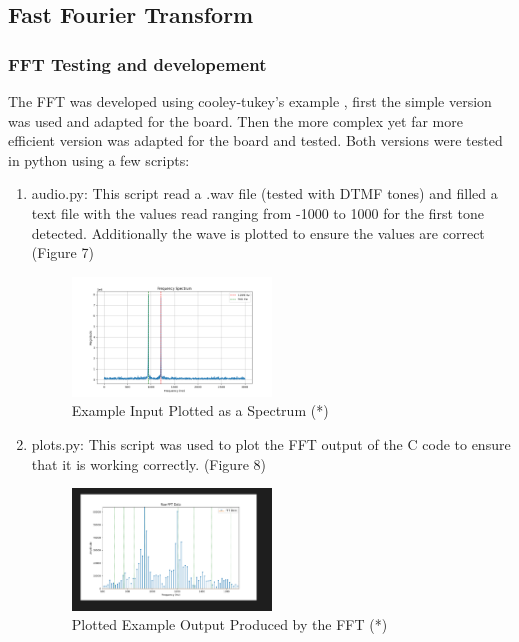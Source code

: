 \documentclass{cce2014-design}
\begin{document}
{  \subsection{Fast Fourier Transform}
  {
	  \subsubsection{FFT Testing and developement}
	  The FFT was developed using cooley-tukey's example
	  \cite{cooleyTukeyFFT}, first the
	  simple version was used and adapted for the board.
	  Then the more complex yet far more efficient version was
	  adapted for the board and tested. Both versions were tested in python
	  using a
	  few scripts:
	  \begin{enumerate}
		  \item audio.py: This script read a .wav file (tested
		        with DTMF tones) and filled a text file with the values
		        read ranging from -1000
		        to 1000 for the first tone detected. Additionally the
		        wave is plotted to ensure the values are correct
		        (Figure 7)
		        \begin{figure}[H]
			        \centering
			        \includegraphics[width=0.5\textwidth]{spectrum}
			        \caption{Example Input Plotted as a
				        Spectrum (*)}
			        \label{fig : Example Input Plotted as a
				        Spectrum}
		        \end{figure}
		  \item plots.py: This script was used to plot the FFT
		        output of the C code to ensure that it is working
		        correctly. (Figure 8)
		        \begin{figure}[H]
			        \centering
			        \includegraphics[width=0.5\textwidth]{fft}
			        \caption{ Plotted Example Output
				        Produced by the FFT (*)}
			        \label{fig : Plotted Example Output
				        Produced by the FFT}
		        \end{figure}
	  \end{enumerate}

}}
\end{document}
